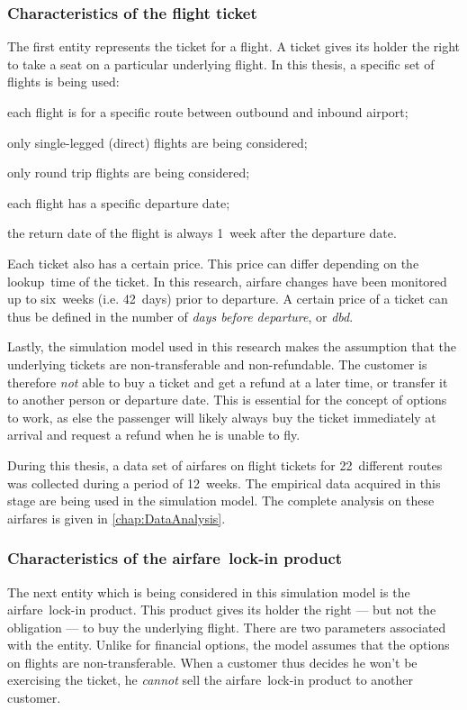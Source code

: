\subsubsection{Characteristics of the flight ticket}
\label{sub:CharacteristicsOfTheFlightTicket}
The first entity represents the ticket for a flight. A ticket gives its holder the right to take a seat on a particular underlying flight. In this thesis, a specific set of flights is being used:

\begin{compactitem}
\item each flight is for a specific route between outbound and inbound airport;
\item only single-legged (direct) flights are being considered;
\item only round trip flights are being considered;
\item each flight has a specific departure date;
\item the return date of the flight is always 1~week after the departure date.
\end{compactitem}

\vspace{1em}

Each ticket also has a certain price. This price can differ depending on the lookup~time of the ticket. In this research, airfare changes have been monitored up to six~weeks (i.e. 42~days) prior to departure. A certain price of a ticket can thus be defined in the number of \emph{days before departure}, or \emph{dbd}.

Lastly, the simulation model used in this research makes the assumption that the underlying tickets are non-transferable and non-refundable. The customer is therefore \emph{not} able to buy a ticket and get a refund at a later time, or transfer it to another person or departure date. This is essential for the concept of options to work, as else the passenger will likely always buy the ticket immediately at arrival and request a refund when he is unable to fly.

During this thesis, a data set of airfares on flight tickets for 22~different routes was collected during a period of 12~weeks. The empirical data acquired in this stage are being used in the simulation model. The complete analysis on these airfares is given in \autoref{chap:DataAnalysis}.


\subsubsection{Characteristics of the airfare~lock-in product}
The next entity which is being considered in this simulation model is the airfare~lock-in product. This product gives its holder the right --- but not the obligation --- to buy the underlying flight. There are two parameters associated with the entity. Unlike for financial options, the model assumes that the options on flights are non-transferable. When a customer thus decides he won't be exercising the ticket, he \emph{cannot} sell the airfare~lock-in product to another customer.

